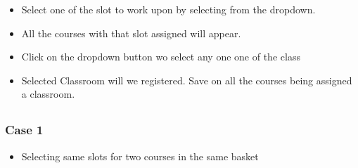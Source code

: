 \documentclass[letterpaper,10pt,english]{sphinxmanual}
\begin{document}
\begin{itemize}
\item {} 
Select one of the slot to work upon by selecting from the dropdown.

\end{itemize}

\begin{itemize}
\item {} 
All the courses with that slot assigned will appear.

\end{itemize}

\begin{itemize}
\item {} 
Click on the dropdown button wo select any one one of the class

\end{itemize}

\begin{itemize}
\item {} 
Selected Classroom will we registered. Save on all the courses being assigned a classroom.

\end{itemize}



\subsection{}
\label{\detokenize{user_manual:id6}}

\subsubsection{Case 1}
\label{\detokenize{user_manual:id7}}\begin{itemize}
\item {} 
Selecting same slots for two courses in the same basket

\end{itemize}
\end{document}
